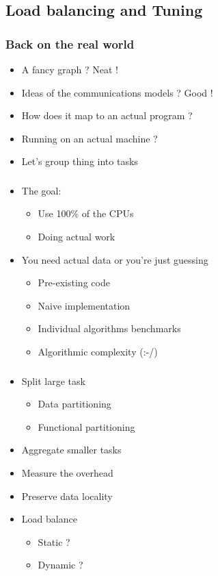 \subsection{Load balancing and Tuning}
\label{subsec:label}

\begin{frame}
  \frametitle{Back on the real world}

  \begin{itemize}
  \item A fancy graph ? Neat !
  \item Ideas of the communications models ? Good !
  \item How does it map to an actual program ?
  \item Running on an actual machine ?
  \item Let's group thing into tasks
  \end{itemize}
\end{frame}

\begin{frame}
  \frametitle{}

  \begin{itemize}
  \item The goal:
    \begin{itemize}
    \item Use 100\% of the CPUs
    \item Doing actual work
    \end{itemize}
  \item You need actual data or you're just guessing
    \begin{itemize}
    \item Pre-existing code
    \item Naive implementation
    \item Individual algorithms benchmarks
    \item Algorithmic complexity (:-/)
    \end{itemize}
  \end{itemize}
\end{frame}


\begin{frame}
  \frametitle{}

  \begin{itemize}
  \item Split large task
    \begin{itemize}
    \item Data partitioning
    \item Functional partitioning
    \end{itemize}
  \item Aggregate smaller tasks
  \item Measure the overhead
  \item Preserve data locality
  \item Load balance
    \begin{itemize}
    \item Static ?
    \item Dynamic ?
    \end{itemize}
  \end{itemize}
\end{frame}


